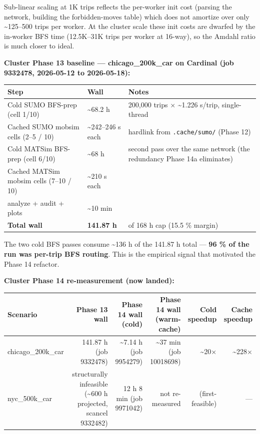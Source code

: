 Sub-linear scaling at 1K trips reflects the per-worker init cost
(parsing the network, building the forbidden-moves table) which does not
amortize over only \textasciitilde125--500 trips per worker. At the
cluster scale these init costs are dwarfed by the in-worker BFS time
(12.5K--31K trips per worker at 16-way), so the Amdahl ratio is much
closer to ideal.

\textbf{Cluster Phase 13 baseline --- chicago\_200k\_car on Cardinal
(job 9332478, 2026-05-12 to 2026-05-18):}

\begin{longtable}[]{@{}lll@{}}
\toprule\noalign{}
Step & Wall & Notes \\
\midrule\noalign{}
\endhead
\bottomrule\noalign{}
\endlastfoot
Cold SUMO BFS-prep (cell 1/10) & \textasciitilde68.2 h & 200,000 trips ×
\textasciitilde1.226 s/trip, single-thread \\
Cached SUMO mobsim cells (2--5 / 10) & \textasciitilde242--246 s each &
hardlink from \texttt{.cache/sumo/} (Phase 12) \\
Cold MATSim BFS-prep (cell 6/10) & \textasciitilde68 h & second pass
over the same network (the redundancy Phase 14a eliminates) \\
Cached MATSim mobsim cells (7--10 / 10) & \textasciitilde210 s each & \\
analyze + audit + plots & \textasciitilde10 min & \\
\textbf{Total wall} & \textbf{141.87 h} & of 168 h cap (15.5 \%
margin) \\
\end{longtable}

The two cold BFS passes consume \textasciitilde136 h of the 141.87 h
total --- \textbf{96 \% of the run was per-trip BFS routing}. This is
the empirical signal that motivated the Phase 14 refactor.

\textbf{Cluster Phase 14 re-measurement (now landed):}

\begin{longtable}[]{@{}lrrrrr@{}}
\toprule\noalign{}
Scenario & Phase 13 wall & Phase 14 wall (cold) & Phase 14 wall
(warm-cache) & Cold speedup & Cache speedup \\
\midrule\noalign{}
\endhead
\bottomrule\noalign{}
\endlastfoot
chicago\_200k\_car & 141.87 h (job 9332478) & \textasciitilde7.14 h (job
9954279) & \textasciitilde37 min (job 10018698) & \textasciitilde20× &
\textasciitilde228× \\
nyc\_500k\_car & structurally infeasible (\textasciitilde600 h
projected, scancel 9332482) & 12 h 8 min (job 9971042) & not re-measured
& (first-feasible) & --- \\
\end{longtable}

